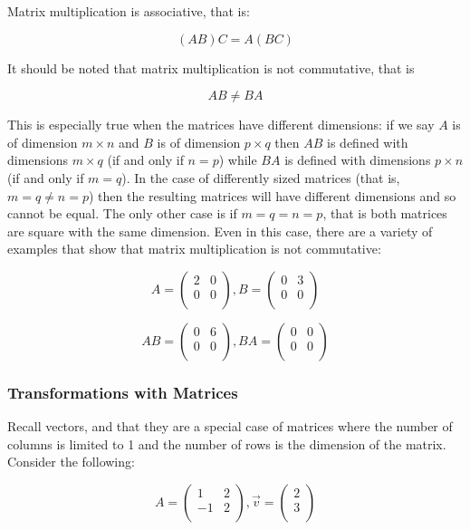 \documentclass[a4paper,oneside]{report}
\begin{document}
Matrix multiplication is associative, that is:

\[ (AB) C = A (BC) \]

It should be noted that matrix multiplication is not commutative, that is

\[ AB \neq BA \]

This is especially true when the matrices have different dimensions: if we
say \( A \) is of dimension \( m \times n \) and \( B \) is of dimension
\( p \times q \) then \( AB \) is defined with dimensions \( m \times q \)
(if and only if \( n = p \)) while \( BA \) is defined with dimensions
\( p \times n \) (if and only if \( m = q \)). In the case of differently
sized matrices (that is, \( m = q \neq n = p \)) then the resulting matrices
will have different dimensions and so cannot be equal. The only other case is
if \( m = q = n = p \), that is both matrices are square with the same
dimension. Even in this case, there are a variety of examples that show that
matrix multiplication is not commutative:

\[ A = \begin{pmatrix}
	2 & 0 \\
	0 & 0 \\
\end{pmatrix}, B = \begin{pmatrix}
	0 & 3 \\
	0 & 0 \\
\end{pmatrix} \]

\[ AB = \begin{pmatrix}
	0 & 6 \\
	0 & 0 \\
\end{pmatrix}, BA = \begin{pmatrix}
	0 & 0 \\
	0 & 0 \\
\end{pmatrix} \]

\subsubsection{Transformations with Matrices}

Recall vectors, and that they are a special case of matrices where the number
of columns is limited to 1 and the number of rows is the dimension of the
matrix. Consider the following:

\[ A = \begin{pmatrix}
	1 & 2 \\
	-1 & 2 \\
\end{pmatrix}, \overrightarrow{v} = \begin{pmatrix}
	2 \\
	3 \\
\end{pmatrix} \]
\end{document}
